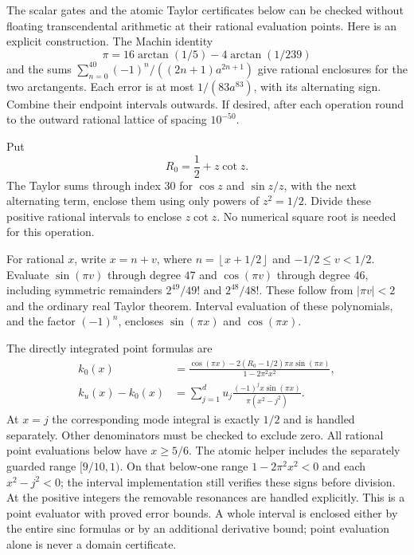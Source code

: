 \documentclass[11pt]{amsart}
\numberwithin{equation}{section}
\newcommand{\floor}[1]{\left\lfloor #1\right\rfloor}
\begin{document}
The scalar gates and the atomic Taylor certificates below can be
checked without floating transcendental arithmetic at their rational
evaluation points. Here is an explicit construction. The Machin
identity
\begin{equation}\label{eq:machin}
 \pi=16\arctan(1/5)-4\arctan(1/239)
\end{equation}
and the sums $\sum_{n=0}^{40}(-1)^n/((2n+1)a^{2n+1})$ give rational
enclosures for the two arctangents. Each error is at most
$1/(83a^{83})$, with its alternating sign. Combine their endpoint
intervals outwards. If desired, after each operation round to the
outward rational lattice of spacing $10^{-50}$.

Put
\begin{equation}\label{eq:R0}
 R_0=\frac12+z\cot z.
\end{equation}
The Taylor sums through index $30$ for $\cos z$ and $\sin z/z$, with
the next alternating term, enclose them using only powers of
$z^2=1/2$. Divide these positive rational intervals to enclose
$z\cot z$. No numerical square root is needed for this operation.

For rational $x$, write $x=n+v$, where $n=\floor{x+1/2}$ and
$-1/2\leq v<1/2$. Evaluate $\sin(\pi v)$ through degree $47$ and
$\cos(\pi v)$ through degree $46$, including symmetric remainders
$2^{49}/49!$ and $2^{48}/48!$. These follow from $|\pi v|<2$ and
the ordinary real Taylor theorem. Interval evaluation of these
polynomials, and the factor $(-1)^n$, encloses $\sin(\pi x)$ and
$\cos(\pi x)$.

The directly integrated point formulas are
\begin{align}
 k_0(x)&=\frac{\cos(\pi x)-2(R_0-1/2)\pi x\sin(\pi x)}
                    {1-2\pi^2x^2},\label{eq:rationalkernel}\\
 k_u(x)-k_0(x)&=\sum_{j=1}^d
       u_j\frac{(-1)^jx\sin(\pi x)}{\pi(x^2-j^2)}.
       \label{eq:rationalmodes}
\end{align}
At $x=j$ the corresponding mode integral is exactly $1/2$ and is
handled separately. Other denominators must be checked to exclude zero.
All rational point evaluations below have $x\geq5/6$. The atomic
helper includes the separately guarded range $[9/10,1)$.
On that below-one range $1-2\pi^2x^2<0$ and each $x^2-j^2<0$; the interval
implementation still verifies these signs before division. At the
positive integers the removable resonances are handled explicitly.
This is a point evaluator with proved error bounds. A whole interval is
enclosed either by the entire sinc formulas or by an additional
derivative bound; point evaluation alone is never a domain certificate.
\end{document}
